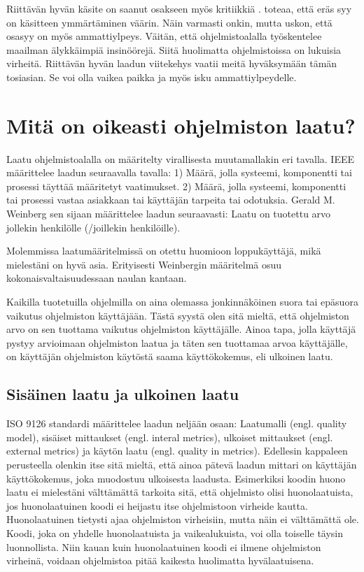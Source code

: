 \documentclass[a4paper]{article}
\begin{document}
Riittävän hyvän käsite on saanut osakseen myös kritiikkiä \citep{bach1997}. \citet{bach1997} toteaa, että eräs syy on käsitteen ymmärtäminen väärin. Näin varmasti onkin, mutta uskon, että osasyy on myös ammattiylpeys. Väitän, että ohjelmistoalalla työskentelee maailman älykkäimpiä insinöörejä. Siitä huolimatta ohjelmistoissa on lukuisia virheitä. Riittävän hyvän laadun viitekehys vaatii meitä hyväksymään tämän tosiasian. Se voi olla vaikea paikka ja myös isku ammattiylpeydelle.

\section{Mitä on oikeasti ohjelmiston laatu?}

Laatu ohjelmistoalalla on määritelty virallisesta muutamallakin eri tavalla. IEEE määrittelee laadun seuraavalla tavalla: 1) Määrä, jolla systeemi, komponentti tai prosessi täyttää määritetyt vaatimukset. 2) Määrä, jolla systeemi, komponentti tai prosessi vastaa asiakkaan tai käyttäjän tarpeita tai odotuksia. Gerald M. Weinberg sen sijaan määrittelee laadun seuraavasti: Laatu on tuotettu arvo jollekin henkilölle (/joillekin henkilöille). \citep{itkonen2011}

Molemmissa laatumääritelmissä on otettu huomioon loppukäyttäjä, mikä mielestäni on hyvä asia. Erityisesti Weinbergin määritelmä osuu kokonaisvaltaisuudessaan naulan kantaan. 

Kaikilla tuotetuilla ohjelmilla on aina olemassa jonkinnäköinen suora tai epäsuora vaikutus ohjelmiston käyttäjään. Tästä syystä olen sitä mieltä, että ohjelmiston arvo on sen tuottama vaikutus ohjelmiston käyttäjälle. Ainoa tapa, jolla käyttäjä pystyy arvioimaan ohjelmiston laatua ja täten sen tuottamaa arvoa käyttäjälle, on käyttäjän ohjelmiston käytöstä saama käyttökokemus, eli ulkoinen laatu.

\subsection{Sisäinen laatu ja ulkoinen laatu}

ISO 9126 standardi määrittelee laadun neljään osaan: Laatumalli (engl. quality model), sisäiset mittaukset (engl. interal metrics), ulkoiset mittaukset (engl. external metrics) ja käytön laatu (engl. quality in metrics). Edellesin kappaleen perusteella olenkin itse sitä mieltä, että ainoa pätevä laadun mittari on käyttäjän käyttökokemus, joka muodostuu ulkoisesta laadusta. Esimerkiksi koodin huono laatu ei mielestäni välttämättä tarkoita sitä, että ohjelmisto olisi huonolaatuista, jos huonolaatuinen koodi ei heijastu itse ohjelmistoon virheide kautta. Huonolaatuinen tietysti ajaa ohjelmiston virheisiin, mutta näin ei välttämättä ole. Koodi, joka on yhdelle huonolaatuista ja vaikealukuista, voi olla toiselle täysin luonnollista. Niin kauan kuin huonolaatuinen koodi ei ilmene ohjelmiston virheinä, voidaan ohjelmistoa pitää kaikesta huolimatta hyvälaatuisena.
\end{document}
